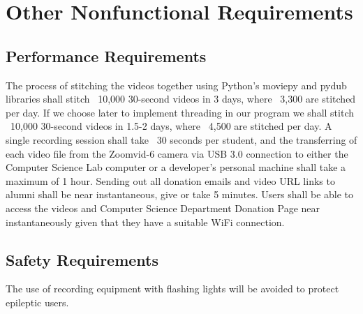 \section{Other Nonfunctional Requirements}
%

\subsection{Performance Requirements}

The process of stitching the videos together using Python's moviepy and pydub libraries
shall stitch ~10,000 30-second videos in 3 days, where ~3,300 are stitched per day. If we
choose later to implement threading in our program we shall stitch ~10,000 30-second videos in 1.5-2 days, 
where ~4,500 are stitched per day. A single recording session shall take ~30 seconds per student, 
and the transferring of each video file from the Zoomvid-6 camera via USB 3.0 connection to either the Computer 
Science Lab computer or a developer's personal machine shall take a maximum of 1 hour. Sending out all donation 
emails and video URL links to alumni shall be near instantaneous, give or take 5 minutes. Users shall be able 
to access the videos and Computer Science Department Donation Page near instantaneously
given that they have a suitable WiFi connection.

\subsection{Safety Requirements}

The use of recording equipment with flashing lights will be avoided to protect epileptic users.

